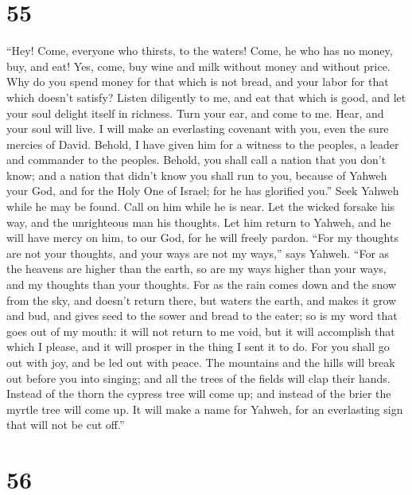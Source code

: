 \hypertarget{section-52}{%
\section{55}\label{section-52}}

 ``Hey! Come, everyone who thirsts, to the waters! Come,
he who has no money, buy, and eat! Yes, come, buy wine and milk without
money and without price.  Why do you spend money for that
which is not bread, and your labor for that which doesn't satisfy?
Listen diligently to me, and eat that which is good, and let your soul
delight itself in richness.  Turn your ear, and come to
me. Hear, and your soul will live. I will make an everlasting covenant
with you, even the sure mercies of David.  Behold, I have
given him for a witness to the peoples, a leader and commander to the
peoples.  Behold, you shall call a nation that you don't
know; and a nation that didn't know you shall run to you, because of
Yahweh your God, and for the Holy One of Israel; for he has glorified
you.''  Seek Yahweh while he may be found. Call on him
while he is near.  Let the wicked forsake his way, and the
unrighteous man his thoughts. Let him return to Yahweh, and he will have
mercy on him, to our God, for he will freely pardon. 
``For my thoughts are not your thoughts, and your ways are not my
ways,'' says Yahweh.  ``For as the heavens are higher than
the earth, so are my ways higher than your ways, and my thoughts than
your thoughts.  For as the rain comes down and the snow
from the sky, and doesn't return there, but waters the earth, and makes
it grow and bud, and gives seed to the sower and bread to the eater;
 so is my word that goes out of my mouth: it will not
return to me void, but it will accomplish that which I please, and it
will prosper in the thing I sent it to do.  For you shall
go out with joy, and be led out with peace. The mountains and the hills
will break out before you into singing; and all the trees of the fields
will clap their hands.  Instead of the thorn the cypress
tree will come up; and instead of the brier the myrtle tree will come
up. It will make a name for Yahweh, for an everlasting sign that will
not be cut off.''

\hypertarget{section-53}{%
\section{56}\label{section-53}}

